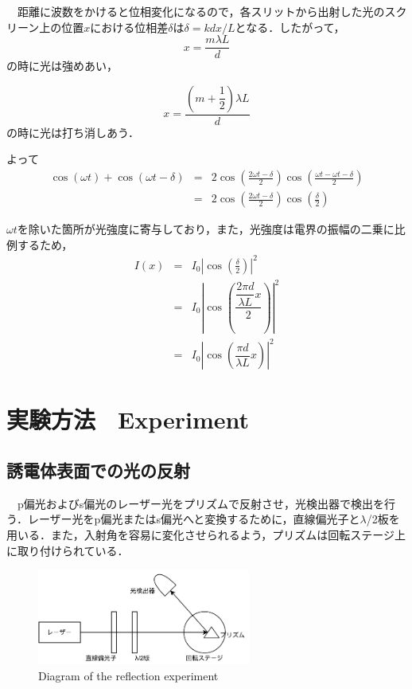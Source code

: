 　距離に波数をかけると位相変化になるので，各スリットから出射した光のスクリーン上の位置$x$における位相差$\delta$は$\delta = kdx/L$となる．したがって，
\begin{equation}
    x = \frac{m \lambda L}{d}
\end{equation}
の時に光は強めあい，

\begin{equation}
    x = \dfrac{\left(m+\dfrac{1}{2}\right) \lambda L}{d}
\end{equation}
の時に光は打ち消しあう．

よって
\begin{eqnarray}
    \cos(\omega t) + \cos(\omega t - \delta) &=& 2\cos\left(\frac{2 \omega t - \delta}{2}\right)\cos\left(\frac{\omega t - \omega t - \delta}{2}\right) \nonumber\\
    &=& 2\cos\left(\frac{2 \omega t - \delta}{2}\right) \cos\left(\frac{\delta}{2}\right)
\end{eqnarray}

$\omega t$を除いた箇所が光強度に寄与しており，また，光強度は電界の振幅の二乗に比例するため，
\begin{eqnarray}
    I(x) &=& I_0 \left|  \cos\left(\frac{\delta}{2}\right) \right|^2 \nonumber\\
    &=& I_0 \left|  \cos\left(\dfrac{\dfrac{2 \pi d}{\lambda L}x}{2}\right) \right|^2 \nonumber\\
    &=& I_0 \left|  \cos\left(\dfrac{\pi d}{\lambda L}x\right) \right|^2
\end{eqnarray}

\section{実験方法　Experiment}
\subsection{誘電体表面での光の反射}
　p偏光およびs偏光のレーザー光をプリズムで反射させ，光検出器で検出を行う．レーザー光をp偏光またはs偏光へと変換するために，直線偏光子と$\lambda$/2板を用いる．また，入射角を容易に変化させられるよう，プリズムは回転ステージ上に取り付けられている．
\begin{figure}[H]
    \centering
    \includegraphics[width=7cm]{./fig/fig3.pdf}
    \caption{Diagram of the reflection experiment}
    \label{fig:diagram_of_the_reflection_experiment}
\end{figure}

